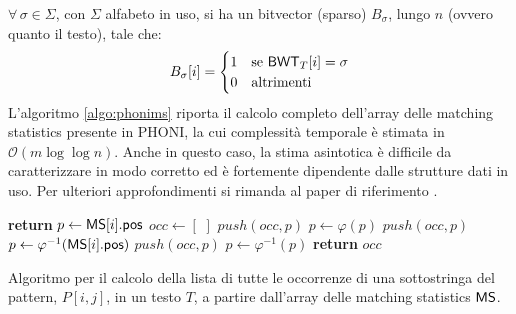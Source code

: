 $\forall\, \sigma \in \Sigma$, con $\Sigma$ alfabeto in uso, si ha un
bitvector (sparso) $B_{\sigma}$, lungo $n$ (ovvero quanto il testo), tale che:
\begin{equation}
  \label{eq:rlbwt10}
  B_{\sigma}[i]=
  \begin{cases}
    1&\mbox{se } \mbox{\rm {\sf BWT}}_T[i]=\sigma\\
    0&\mbox{altrimenti}
  \end{cases}
\end{equation}
L'algoritmo \ref{algo:phonims} \cite{phoni}
riporta il calcolo completo dell'array delle matching statistics presente in
PHONI, la cui 
complessità temporale è stimata in $\mathcal{O}(m\log\log n)$.
Anche in questo caso, la stima asintotica è difficile da caratterizzare in modo 
corretto ed è fortemente dipendente dalle strutture dati in uso.
Per ulteriori approfondimenti si rimanda al paper di riferimento
\cite{phoni}.
\begin{algorithm}
  \small
  \begin{algorithmic}[1]
    \State \textbf{return}
    \EndIf
    \State $p\gets \mbox{\rm {\sf MS}}[i].\mbox{\rm {\sf pos}}$
    \State $occ\gets [\,\,]$
    \State $push(occ, p)$
    \State $p\gets \varphi(p)$
    \State $push(occ, p)$
    \EndWhile
    \State $p\gets \varphi^{-1}(\mbox{\rm {\sf MS}}[i].\mbox{\rm {\sf pos}})$
    \State $push(occ, p)$
    \State $p\gets \varphi^{-1}(p)$
    \EndWhile
    \State \textbf{return} $occ$
    \EndFunction
  \end{algorithmic}
  \caption{Algoritmo per il calcolo della lista di tutte le occorrenze di una
  sottostringa del pattern, $P[i,j]$, in un testo $T$, a partire dall'array
  delle matching statistics $\mbox{\rm {\sf MS}}$.}
  \label{algo:expand}
\end{algorithm}

